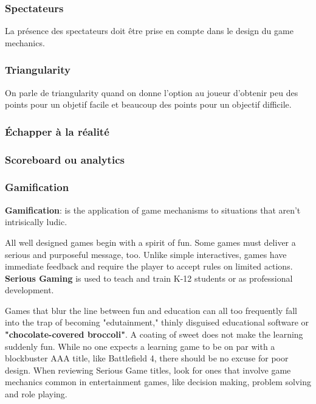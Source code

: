 \subsubsection{Spectateurs}

La pr\'esence des spectateurs doit \^etre prise en compte dans le design du game mechanics.

\subsubsection{Triangularity}

On parle de triangularity quand on donne l'option au joueur d'obtenir peu des points pour un objetif facile et beaucoup des points pour un objectif difficile. 

\subsubsection{\'Echapper \`a la r\'ealit\'e}

\subsubsection{Scoreboard ou analytics}

\subsubsection{Gamification}

\textbf{Gamification}: is the application of game mechanisms to situations that aren't intrisically ludic.

All well designed games begin with a spirit of fun. Some games must deliver a serious and purposeful message, too. Unlike simple interactives, games have immediate feedback and require the player to accept rules on limited actions. \textbf{Serious Gaming} is used to teach and train K-12 students or as professional development. 

Games that blur the line between fun and education can all too frequently fall into the trap of becoming "edutainment," thinly disguised educational software or \textbf{"chocolate-covered broccoli"}. A coating of sweet does not make the learning suddenly fun. While no one expects a learning game to be on par with a blockbuster AAA title, like Battlefield 4, there should be no excuse for poor design. When reviewing Serious Game titles, look for ones that involve game mechanics common in entertainment games, like decision making, problem solving and role playing.

